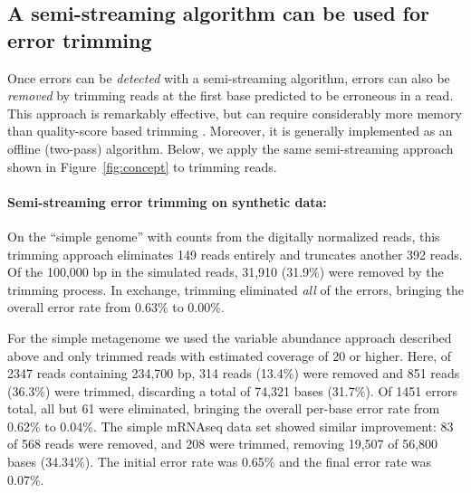 \documentclass{article}
\begin{document}
\subsection{A semi-streaming algorithm can be used for error trimming}

Once errors can be {\em detected} with a semi-streaming algorithm, errors
can also be {\em removed} by trimming reads at the first base
predicted to be erroneous in a read.  This approach is remarkably
effective, but can require considerably more memory than quality-score
based trimming \cite{Zhang2014}.  Moreover, it is generally
implemented as an offline (two-pass) algorithm.  Below, we apply the same
semi-streaming approach shown in Figure~\ref{fig:concept} to trimming
reads.



\paragraph{Semi-streaming error trimming on synthetic data:}

On the ``simple genome'' with counts from the digitally normalized
reads, this trimming approach eliminates 149 reads entirely and
truncates another 392 reads.  Of the 100,000 bp in the simulated
reads, 31,910 (31.9\%) were removed by the trimming process.  In
exchange, trimming eliminated {\em all} of the errors, bringing the
overall error rate from 0.63\% to 0.00\%.


For the simple metagenome we used the variable abundance approach
described above and only trimmed reads with estimated coverage of 20
or higher.  Here, of 2347 reads containing 234,700 bp, 314 reads
(13.4\%) were removed and 851 reads (36.3\%) were trimmed, discarding
a total of 74,321 bases (31.7\%).  Of 1451 errors total, all but 61
were eliminated, bringing the overall per-base error rate from 0.62\% to
0.04\%.  The simple mRNAseq data set showed similar improvement: 83 of
568 reads were removed, and 208 were trimmed, removing 19,507 of
56,800 bases (34.34\%).  The initial error rate was 0.65\% and the
final error rate was 0.07\%.

\end{document}
